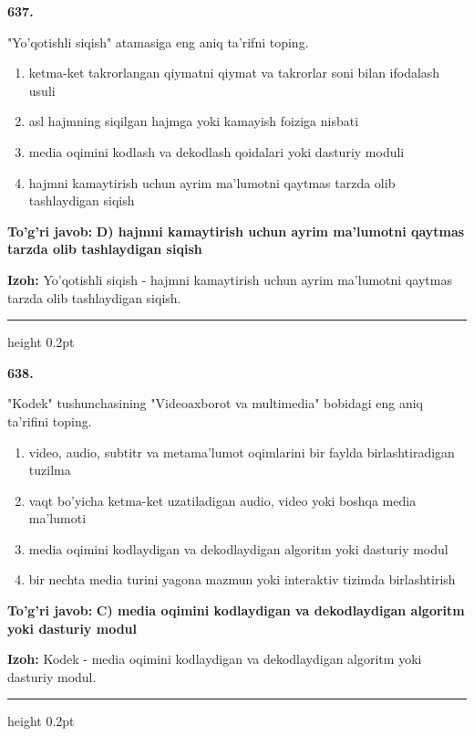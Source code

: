 \documentclass[10pt,a4paper,oneside]{article}
\begin{document}
\noindent\textbf{\color{ink}637.}
\par
"Yo'qotishli siqish" atamasiga eng aniq ta'rifni toping.
\begin{enumerate}[label=\Alph*),leftmargin=9mm]
\item ketma-ket takrorlangan qiymatni qiymat va takrorlar soni bilan ifodalash usuli
\item asl hajmning siqilgan hajmga yoki kamayish foiziga nisbati
\item media oqimini kodlash va dekodlash qoidalari yoki dasturiy moduli
\item hajmni kamaytirish uchun ayrim ma'lumotni qaytmas tarzda olib tashlaydigan siqish
\end{enumerate}
\begin{tcolorbox}[enhanced,breakable,colback=teal!4,colframe=teal!50!black,boxrule=0.5pt,arc=1.1mm,left=3mm,right=3mm,top=1.7mm,bottom=1.7mm,before skip=2mm,after skip=2mm]
\textbf{\color{teal}To'g'ri javob:} \textbf{D) hajmni kamaytirish uchun ayrim ma'lumotni qaytmas tarzda olib tashlaydigan siqish}
\par\smallskip
\textbf{Izoh:} Yo'qotishli siqish - hajmni kamaytirish uchun ayrim ma'lumotni qaytmas tarzda olib tashlaydigan siqish.
\end{tcolorbox}
\vspace{2mm}\hrule height 0.2pt \vspace{3mm}

\noindent\textbf{\color{ink}638.}
\par
"Kodek" tushunchasining "Videoaxborot va multimedia" bobidagi eng aniq ta'rifini toping.
\begin{enumerate}[label=\Alph*),leftmargin=9mm]
\item video, audio, subtitr va metama'lumot oqimlarini bir faylda birlashtiradigan tuzilma
\item vaqt bo'yicha ketma-ket uzatiladigan audio, video yoki boshqa media ma'lumoti
\item media oqimini kodlaydigan va dekodlaydigan algoritm yoki dasturiy modul
\item bir nechta media turini yagona mazmun yoki interaktiv tizimda birlashtirish
\end{enumerate}
\begin{tcolorbox}[enhanced,breakable,colback=teal!4,colframe=teal!50!black,boxrule=0.5pt,arc=1.1mm,left=3mm,right=3mm,top=1.7mm,bottom=1.7mm,before skip=2mm,after skip=2mm]
\textbf{\color{teal}To'g'ri javob:} \textbf{C) media oqimini kodlaydigan va dekodlaydigan algoritm yoki dasturiy modul}
\par\smallskip
\textbf{Izoh:} Kodek - media oqimini kodlaydigan va dekodlaydigan algoritm yoki dasturiy modul.
\end{tcolorbox}
\vspace{2mm}\hrule height 0.2pt \vspace{3mm}
\end{document}
